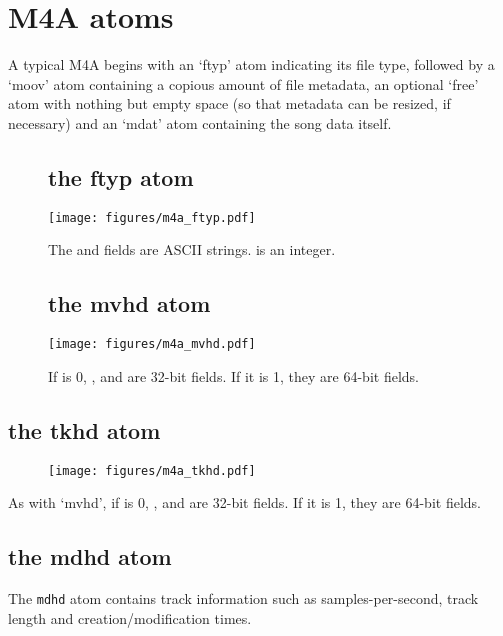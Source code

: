 \section{M4A atoms}
A typical M4A begins with an `ftyp' atom indicating its file type,
followed by a `moov' atom containing a copious amount of file metadata,
an optional `free' atom with nothing but empty space
(so that metadata can be resized, if necessary) and an `mdat' atom
containing the song data itself.
\begin{figure}[h]
\subsection{the ftyp atom}
\texttt{[image: figures/m4a\_ftyp.pdf]}
\par
The  and  fields are ASCII strings.
 is an integer.

\subsection{the mvhd atom}
\texttt{[image: figures/m4a\_mvhd.pdf]}
\par
If  is 0, ,  and
 are 32-bit fields.  If it is 1, they are 64-bit fields.
\end{figure}

\pagebreak

\subsection{the tkhd atom}
\par
\begin{figure}[h]
\texttt{[image: figures/m4a\_tkhd.pdf]}
\end{figure}
\par
\noindent
As with `mvhd', if  is 0, ,
 and  are 32-bit fields.
If it is 1, they are 64-bit fields.

\subsection{the mdhd atom}

The \texttt{mdhd} atom contains track information such as samples-per-second,
track length and creation/modification times.


